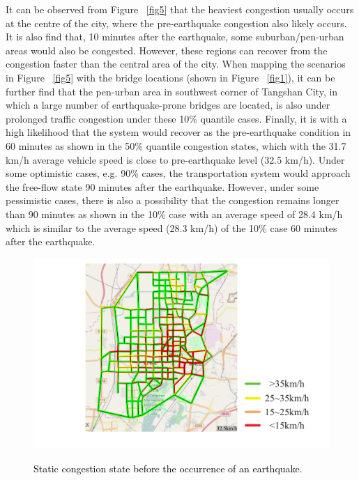 \documentclass[review,11pt,nonatbib]{elsarticle}
\begin{document}
\par It can be observed from Figure ~\ref{fig5} that the heaviest congestion usually occurs at the centre of the city, where the pre-earthquake congestion also likely occurs.  It is also find that, 10 minutes after the earthquake, some suburban/pen-urban areas would also be congested. However, these regions can recover from the congestion faster than the central area of the city. When mapping the scenarios in Figure ~\ref{fig5} with the bridge locations (shown in Figure ~\ref{fig1}), it can be further find that the pen-urban area in southwest corner of Tangshan City, in which a large number of earthquake-prone bridges are located, is also under prolonged traffic congestion under these 10\% quantile cases. Finally, it is with a high likelihood that the system would recover as the pre-earthquake condition in 60 minutes as shown in the 50\% quantile congestion states, which with the 31.7 km/h average vehicle speed is close to pre-earthquake level (32.5 km/h). Under some optimistic cases, e.g. 90\% cases, the transportation system would  approach the free-flow state 90 minutes after the earthquake. However, under some pessimistic cases, there is also a possibility that the congestion remains longer than 90 minutes as shown in the 10\% case with an average speed of 28.4 km/h which is similar to the average speed (28.3 km/h) of the 10\% case 60 minutes after the earthquake.  


\begin{figure}[!htp]\centering
\includegraphics[width=12cm]{fig3.pdf}\\
\caption{\textcolor{black}{Static congestion state before the occurrence of an earthquake}.}\label{fig3}
\end{figure}
\end{document}
